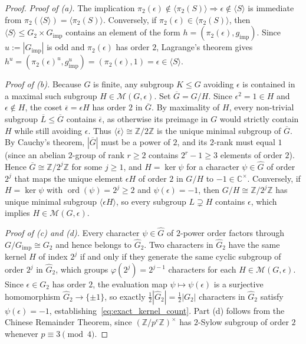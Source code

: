 \documentclass[11pt, a4paper]{article}
\theoremstyle{plain}
\theoremstyle{definition}
\newcommand{\Z}{\mathbb{Z}}
\newcommand{\C}{\mathbb{C}}
\begin{document}
\begin{proof}
\emph{Proof of (a).} The implication $\pi_2(\epsilon)\notin\langle\pi_2(S)\rangle\Rightarrow\epsilon\notin\langle S\rangle$ is immediate from $\pi_2(\langle S\rangle)=\langle\pi_2(S)\rangle$. Conversely, if $\pi_2(\epsilon)\in\langle\pi_2(S)\rangle$, then $\langle S\rangle\le G_2\times G_{\mathrm{imp}}$ contains an element of the form $h=(\pi_2(\epsilon),g_{\mathrm{imp}})$. Since $u:=|G_{\mathrm{imp}}|$ is odd and $\pi_2(\epsilon)$ has order $2$, Lagrange's theorem gives $h^{u}=(\pi_2(\epsilon)^{u},g_{\mathrm{imp}}^{u})=(\pi_2(\epsilon),1)=\epsilon\in\langle S\rangle$.

\medskip\noindent\emph{Proof of (b).} Because $G$ is finite, any subgroup $K\le G$ avoiding $\epsilon$ is contained in a maximal such subgroup $H\in\mathcal{M}(G,\epsilon)$. Set $\overline{G}=G/H$. Since $\epsilon^{2}=1\in H$ and $\epsilon\notin H$, the coset $\overline{\epsilon}=\epsilon H$ has order $2$ in $\overline{G}$. By maximality of $H$, every non-trivial subgroup $\overline{L}\le\overline{G}$ contains $\overline{\epsilon}$, as otherwise its preimage in $G$ would strictly contain $H$ while still avoiding $\epsilon$. Thus $\langle\overline{\epsilon}\rangle\cong\Z/2\Z$ is the unique minimal subgroup of $\overline{G}$. By Cauchy's theorem, $|\overline{G}|$ must be a power of $2$, and its $2$-rank must equal $1$ (since an abelian $2$-group of rank $r\ge2$ contains $2^{r}-1\ge3$ elements of order $2$). Hence $\overline{G}\cong\Z/2^{j}\Z$ for some $j\ge1$, and $H=\ker\psi$ for a character $\psi\in\widehat{G}$ of order $2^{j}$ that maps the unique element $\epsilon H$ of order $2$ in $G/H$ to $-1\in\C^{\times}$. Conversely, if $H=\ker\psi$ with $\operatorname{ord}(\psi)=2^{j}\ge2$ and $\psi(\epsilon)=-1$, then $G/H\cong\Z/2^{j}\Z$ has unique minimal subgroup $\langle\epsilon H\rangle$, so every subgroup $L\supsetneq H$ contains $\epsilon$, which implies $H\in\mathcal{M}(G,\epsilon)$.

\medskip\noindent\emph{Proof of (c) and (d).} Every character $\psi\in\widehat{G}$ of $2$-power order factors through $G/G_{\mathrm{imp}}\cong G_2$ and hence belongs to $\widehat{G}_2$. Two characters in $\widehat{G}_2$ have the same kernel $H$ of index $2^{j}$ if and only if they generate the same cyclic subgroup of order $2^{j}$ in $\widehat{G}_2$, which groups $\varphi(2^{j})=2^{j-1}$ characters for each $H\in\mathcal{M}(G,\epsilon)$. Since $\epsilon\in G_2$ has order $2$, the evaluation map $\psi\mapsto\psi(\epsilon)$ is a surjective homomorphism $\widehat{G}_2\to\{\pm1\}$, so exactly $\frac12|\widehat{G}_2|=\frac12|G_2|$ characters in $\widehat{G}_2$ satisfy $\psi(\epsilon)=-1$, establishing~\eqref{eq:exact_kernel_count}. Part (d) follows from the Chinese Remainder Theorem, since $(\Z/p^{e}\Z)^{\times}$ has $2$-Sylow subgroup of order $2$ whenever $p\equiv3\pmod 4$.
\end{proof}
\end{document}
